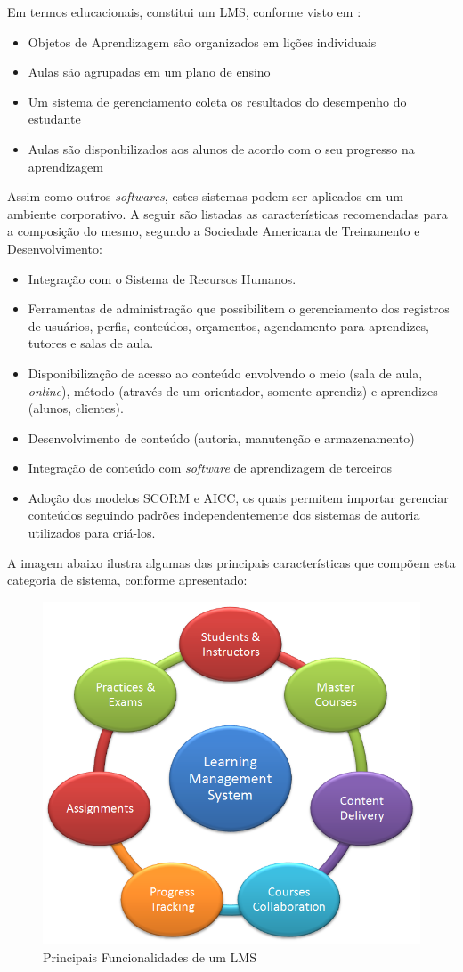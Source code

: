 \documentclass[12pt]{article}
\begin{document}
Em termos educacionais, constitui um LMS, conforme visto em \cite{bailey1992wanted}:

\begin{itemize}
 \item Objetos de Aprendizagem são organizados em lições individuais
 \item Aulas são agrupadas em um plano de ensino
 \item Um sistema de gerenciamento coleta os resultados do desempenho do estudante
 \item Aulas são disponbilizados aos alunos de acordo com o seu progresso na aprendizagem
\end{itemize}

Assim como outros \textit{softwares}, estes sistemas podem ser aplicados em um ambiente corporativo. A seguir são listadas as características 
recomendadas para a composição do mesmo, segundo a Sociedade Americana de Treinamento e Desenvolvimento:

\begin{itemize}
 \item Integração com o Sistema de Recursos Humanos.
 \item Ferramentas de administração que possibilitem o gerenciamento dos registros de usuários, perfis, conteúdos, orçamentos, agendamento para 
 aprendizes, tutores e salas de aula.
 \item Disponibilização de acesso ao conteúdo envolvendo o meio (sala de aula, \textit{online}), método (através de um orientador, 
 somente aprendiz) e aprendizes (alunos, clientes).
 \item Desenvolvimento de conteúdo (autoria, manutenção e armazenamento)
 \item Integração de conteúdo com \textit{software} de aprendizagem de terceiros
 \item Adoção dos modelos SCORM e AICC, os quais permitem importar gerenciar conteúdos seguindo padrões independentemente dos sistemas de 
 autoria utilizados para criá-los.
\end{itemize}

A imagem abaixo ilustra algumas das principais características que compõem esta categoria de sistema, conforme apresentado:

\begin{figure}[ht]
\centering
\includegraphics[width=.5\textwidth]{lmscloud.png}
\caption{Principais Funcionalidades de um LMS}
\end{figure}
\end{document}
